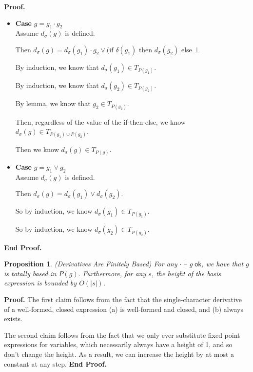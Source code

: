 \documentclass{article}
\newcommand{\judgeok}[2][\Gamma]{{#1} \vdash {#2} \;\mathsf{ok}}
\newcommand{\deriv}[2]{d_{#1}({#2})}
\newcommand{\IfThenElse}[3]{\mbox{if }{#1}\mbox{ then }{#2}\mbox{ else }{#3}}
\newcommand{\emptify}[1]{\delta({#1})}
\newcommand{\pieces}[1]{P({#1})}
\newtheorem{prop}{Proposition}
\newenvironment{proof}{\noindent\textbf{Proof.}}{\noindent\textbf{End Proof.}}
\newenvironment{caseblock}{\begin{itemize}}{\end{itemize}}
\newenvironment{case}[1]{\item \textbf{Case} {#1}\\}{}
\begin{document}
\begin{proof}
\begin{caseblock}
    \begin{case}{$g = g_1 \cdot g_2$}
      Assume $\deriv{\sigma}{g}$ is defined. 

      Then $\deriv{\sigma}{g} = \deriv{\sigma}{g_1}\cdot g_2 \vee (\IfThenElse{\emptify{g_1}}{\deriv{\sigma}{g_2}}{\bot}$

      By induction, we know that $\deriv{\sigma}{g_1} \in T_{\pieces{g_1}}$. 

      By induction, we know that $\deriv{\sigma}{g_2} \in T_{\pieces{g_2}}$. 
      
      By lemma, we know that $g_2 \in T_{\pieces{g_2}}$. 

      Then, regardless of the value of the if-then-else, we know $\deriv{\sigma}{g} \in T_{\pieces{g_1} \cup \pieces{g_2}}$. 

      Then we know $\deriv{\sigma}{g} \in T_{\pieces{g}}$. 
    \end{case}

    \begin{case}{$g = g_1 \vee g_2$}
      Assume $\deriv{\sigma}{g}$ is defined. 

      Then $\deriv{\sigma}{g} = \deriv{\sigma}{g_1} \vee \deriv{\sigma}{g_2}$. 

      So by induction, we know $\deriv{\sigma}{g_1} \in T_{\pieces{g_1}}$. 

      So by induction, we know $\deriv{\sigma}{g_2} \in T_{\pieces{g_2}}$. 
    \end{case}
  \end{caseblock}
\end{proof}

\begin{prop}{(Derivatives Are Finitely Based)}
  For any $\judgeok[\cdot]{g}$, we have that $g$ is totally based in
  $\pieces{g}$. Furthermore, for any $s$, the height of the basis
  expression is bounded by $O(|s|)$.
\end{prop}

\begin{proof}
  The first claim follows from the fact that the single-character
  derivative of a well-formed, closed expression (a) is well-formed
  and closed, and (b) always exists. 

  The second claim follows from the fact that we only ever substitute
  fixed point expressions for variables, which necessarily always have
  a height of 1, and so don't change the height. As a result, we can
  increase the height by at most a constant at any step.
\end{proof}
\end{document}
